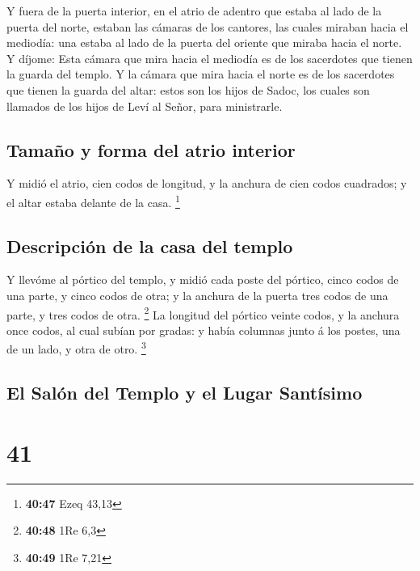  Y fuera de la puerta interior, en el atrio de adentro que
estaba al lado de la puerta del norte, estaban las cámaras de los
cantores, las cuales miraban hacia el mediodía: una estaba al lado de la
puerta del oriente que miraba hacia el norte.  Y díjome:
Esta cámara que mira hacia el mediodía es de los sacerdotes que tienen
la guarda del templo.  Y la cámara que mira hacia el norte
es de los sacerdotes que tienen la guarda del altar: estos son los hijos
de Sadoc, los cuales son llamados de los hijos de Leví al Señor, para
ministrarle.

\hypertarget{tamauxf1o-y-forma-del-atrio-interior}{%
\subsection{Tamaño y forma del atrio
interior}\label{tamauxf1o-y-forma-del-atrio-interior}}

 Y midió el atrio, cien codos de longitud, y la anchura de
cien codos cuadrados; y el altar estaba delante de la casa. \footnote{\textbf{40:47}
  Ezeq 43,13}

\hypertarget{descripciuxf3n-de-la-casa-del-templo}{%
\subsection{Descripción de la casa del
templo}\label{descripciuxf3n-de-la-casa-del-templo}}

 Y llevóme al pórtico del templo, y midió cada poste del
pórtico, cinco codos de una parte, y cinco codos de otra; y la anchura
de la puerta tres codos de una parte, y tres codos de otra. \footnote{\textbf{40:48}
  1Re 6,3}  La longitud del pórtico veinte codos, y la
anchura once codos, al cual subían por gradas: y había columnas junto á
los postes, una de un lado, y otra de otro. \footnote{\textbf{40:49} 1Re
  7,21}

\hypertarget{el-saluxf3n-del-templo-y-el-lugar-santuxedsimo}{%
\subsection{El Salón del Templo y el Lugar
Santísimo}\label{el-saluxf3n-del-templo-y-el-lugar-santuxedsimo}}

\hypertarget{section-40}{%
\section{41}\label{section-40}}

